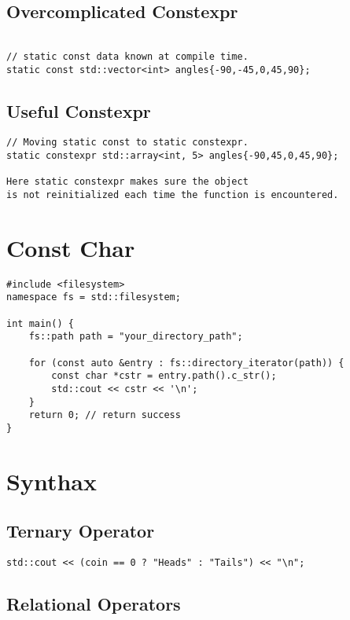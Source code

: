 \subsection{Overcomplicated Constexpr}

\begin{verbatim}

// static const data known at compile time. 
static const std::vector<int> angles{-90,-45,0,45,90};
\end{verbatim}

\subsection{Useful Constexpr}

\begin{verbatim}
// Moving static const to static constexpr.
static constexpr std::array<int, 5> angles{-90,45,0,45,90};

Here static constexpr makes sure the object
is not reinitialized each time the function is encountered.

\end{verbatim}

\section{Const Char}

\begin{verbatim}
#include <filesystem>
namespace fs = std::filesystem;

int main() {
    fs::path path = "your_directory_path";

    for (const auto &entry : fs::directory_iterator(path)) {
        const char *cstr = entry.path().c_str();
        std::cout << cstr << '\n';
    }
    return 0; // return success
}
\end{verbatim}

\section{Synthax}
\subsection{Ternary Operator}
\begin{verbatim}
std::cout << (coin == 0 ? "Heads" : "Tails") << "\n";
\end{verbatim}

\subsection{Relational Operators}

